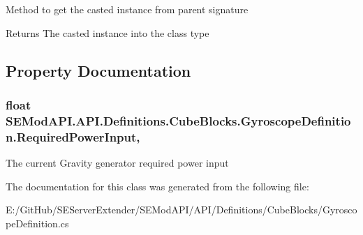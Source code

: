 Method to get the casted instance from parent signature 

\begin{DoxyReturn}{Returns}
The casted instance into the class type
\end{DoxyReturn}


\subsection{Property Documentation}
\hypertarget{class_s_e_mod_a_p_i_1_1_a_p_i_1_1_definitions_1_1_cube_blocks_1_1_gyroscope_definition_a4844c58793c6dab7dbd9caa47efdbcb2}{}
\subsubsection[{Required\+Power\+Input}]{\setlength{\rightskip}{0pt plus 5cm}float S\+E\+Mod\+A\+P\+I.\+A\+P\+I.\+Definitions.\+Cube\+Blocks.\+Gyroscope\+Definition.\+Required\+Power\+Input\hspace{0.3cm}{\ttfamily [get]}, {\ttfamily [set]}}\label{class_s_e_mod_a_p_i_1_1_a_p_i_1_1_definitions_1_1_cube_blocks_1_1_gyroscope_definition_a4844c58793c6dab7dbd9caa47efdbcb2}


The current Gravity generator required power input 



The documentation for this class was generated from the following file\+:\begin{DoxyCompactItemize}
\item 
E\+:/\+Git\+Hub/\+S\+E\+Server\+Extender/\+S\+E\+Mod\+A\+P\+I/\+A\+P\+I/\+Definitions/\+Cube\+Blocks/Gyroscope\+Definition.\+cs\end{DoxyCompactItemize}
